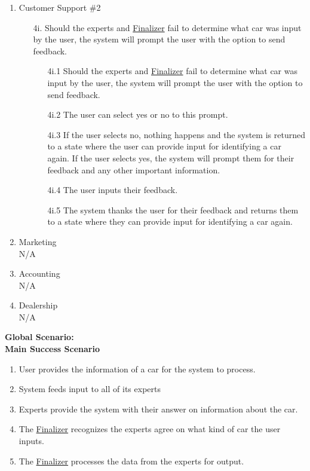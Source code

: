 \documentclass[]{article}
\begin{document}
\begin{enumerate}[label={\bf BE\arabic*.}]
\begin{enumerate}[label={\bf VP\arabic*.}]
\begin{enumerate}
		\end{enumerate}
		\item Customer Support \#2
		\begin{enumerate}
			\color{red}
			\item[4i.] Should the experts and \underline{Finalizer} fail to determine what car was input by the user, the system will prompt the user with the option to send feedback.
			\begin{enumerate}
				\item[4i.1] Should the experts and \underline{Finalizer} fail to determine what car was input by the user, the system will prompt the user with the option to send feedback.
				\item[4i.2] The user can select yes or no to this prompt.
				\item[4i.3] If the user selects no, nothing happens and the system is returned to a state where the user can provide input for identifying a car again. If the user selects yes, the system will prompt them for their feedback and any other important information.
				\item[4i.4] The user inputs their feedback.
				\item[4i.5] The system thanks the user for their feedback and returns them to a state where they can provide input for identifying a car again.
			\end{enumerate}
		\end{enumerate}
		\item Marketing\\
		N/A
		\item Accounting\\
		N/A
		\item Dealership\\
		N/A
		\end{enumerate}
		{\bf Global Scenario:}\\
		\textbf{Main Success Scenario}
		\begin{enumerate}[label={\arabic*.}]
			\color{red}
			\item User provides the information of a car for the system to process.
			\item System feeds input to all of its experts
			\item Experts provide the system with their answer on information about the car.
			\item The \underline{Finalizer} recognizes the experts agree on what kind of car the user inputs.
			\item The \underline{Finalizer} processes the data from the experts for output.

\end{enumerate}
\end{enumerate}
\end{document}

